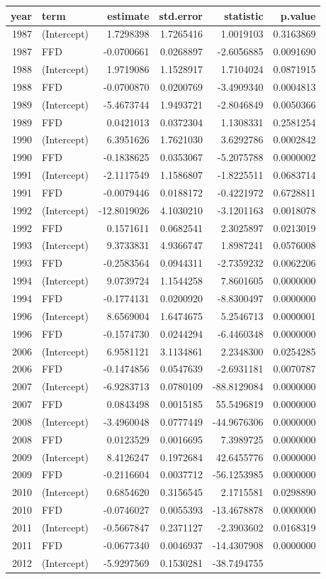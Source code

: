 \documentclass[
]{article}
\begin{document}
\begin{longtable}[]{@{}rlrrrr@{}}
\toprule
year & term & estimate & std.error & statistic & p.value\tabularnewline
\midrule
\endhead
1987 & (Intercept) & 1.7298398 & 1.7265416 & 1.0019103 &
0.3163869\tabularnewline
1987 & FFD & -0.0700661 & 0.0268897 & -2.6056885 &
0.0091690\tabularnewline
1988 & (Intercept) & 1.9719086 & 1.1528917 & 1.7104024 &
0.0871915\tabularnewline
1988 & FFD & -0.0700870 & 0.0200769 & -3.4909340 &
0.0004813\tabularnewline
1989 & (Intercept) & -5.4673744 & 1.9493721 & -2.8046849 &
0.0050366\tabularnewline
1989 & FFD & 0.0421013 & 0.0372304 & 1.1308331 &
0.2581254\tabularnewline
1990 & (Intercept) & 6.3951626 & 1.7621030 & 3.6292786 &
0.0002842\tabularnewline
1990 & FFD & -0.1838625 & 0.0353067 & -5.2075788 &
0.0000002\tabularnewline
1991 & (Intercept) & -2.1117549 & 1.1586807 & -1.8225511 &
0.0683714\tabularnewline
1991 & FFD & -0.0079446 & 0.0188172 & -0.4221972 &
0.6728811\tabularnewline
1992 & (Intercept) & -12.8019026 & 4.1030210 & -3.1201163 &
0.0018078\tabularnewline
1992 & FFD & 0.1571611 & 0.0682541 & 2.3025897 &
0.0213019\tabularnewline
1993 & (Intercept) & 9.3733831 & 4.9366747 & 1.8987241 &
0.0576008\tabularnewline
1993 & FFD & -0.2583564 & 0.0944311 & -2.7359232 &
0.0062206\tabularnewline
1994 & (Intercept) & 9.0739724 & 1.1544258 & 7.8601605 &
0.0000000\tabularnewline
1994 & FFD & -0.1774131 & 0.0200920 & -8.8300497 &
0.0000000\tabularnewline
1996 & (Intercept) & 8.6569004 & 1.6474675 & 5.2546713 &
0.0000001\tabularnewline
1996 & FFD & -0.1574730 & 0.0244294 & -6.4460348 &
0.0000000\tabularnewline
2006 & (Intercept) & 6.9581121 & 3.1134861 & 2.2348300 &
0.0254285\tabularnewline
2006 & FFD & -0.1474856 & 0.0547639 & -2.6931181 &
0.0070787\tabularnewline
2007 & (Intercept) & -6.9283713 & 0.0780109 & -88.8129084 &
0.0000000\tabularnewline
2007 & FFD & 0.0843498 & 0.0015185 & 55.5496819 &
0.0000000\tabularnewline
2008 & (Intercept) & -3.4960048 & 0.0777449 & -44.9676306 &
0.0000000\tabularnewline
2008 & FFD & 0.0123529 & 0.0016695 & 7.3989725 &
0.0000000\tabularnewline
2009 & (Intercept) & 8.4126247 & 0.1972684 & 42.6455776 &
0.0000000\tabularnewline
2009 & FFD & -0.2116604 & 0.0037712 & -56.1253985 &
0.0000000\tabularnewline
2010 & (Intercept) & 0.6854620 & 0.3156545 & 2.1715581 &
0.0298890\tabularnewline
2010 & FFD & -0.0746027 & 0.0055393 & -13.4678878 &
0.0000000\tabularnewline
2011 & (Intercept) & -0.5667847 & 0.2371127 & -2.3903602 &
0.0168319\tabularnewline
2011 & FFD & -0.0677340 & 0.0046937 & -14.4307908 &
0.0000000\tabularnewline
2012 & (Intercept) & -5.9297569 & 0.1530281 & -38.7494755 &

\end{longtable}
\end{document}
